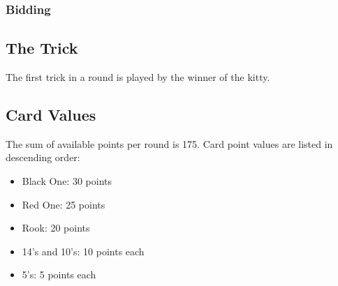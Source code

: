 \documentclass[10pt]{article}
\begin{document}
\subsubsection{Bidding}

\subsection{The Trick}

The first trick in a round is played by the winner of the kitty.

\subsection{Card Values}

The sum of available points per round is 175.
Card point values are listed in descending order:
\begin{itemize}
    \item Black One: 30 points
    \item Red One: 25 points
    \item Rook: 20 points
    \item 14's and 10's: 10 points each
    \item 5's: 5 points each
\end{itemize}
\end{document}
